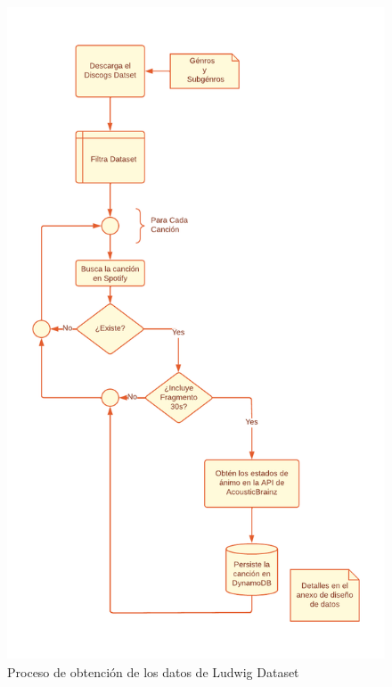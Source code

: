 \begin{figure}
    \centering
    \includegraphics[width=12cm]{img/5/ludwig_dataset.png}
    \caption{Proceso de obtención de los datos de Ludwig Dataset}
    \label{fig:ludwig_dataset}
\end{figure}

